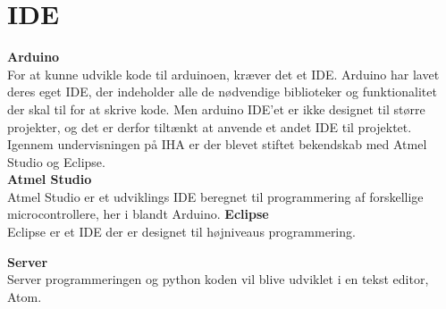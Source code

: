 \section{IDE}

\textbf{Arduino} \\
For at kunne udvikle kode til arduinoen, kræver det et IDE. Arduino har lavet deres eget IDE, der indeholder alle de nødvendige biblioteker og funktionalitet der skal til for at skrive kode. Men arduino IDE'et er ikke designet til større projekter, og det er derfor tiltænkt at anvende et andet IDE til projektet. 
Igennem undervisningen på IHA er der blevet stiftet bekendskab med Atmel Studio og Eclipse. \\

\textbf{Atmel Studio} \\
Atmel Studio er et udviklings IDE beregnet til programmering af forskellige microcontrollere, her i blandt Arduino. 
\textbf{Eclipse} \\
Eclipse er et IDE der er designet til højniveaus programmering. 



\textbf{Server} \\
Server programmeringen og python koden vil blive udviklet i en tekst editor, Atom.  